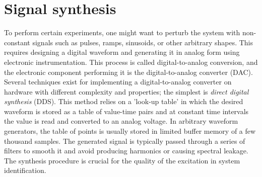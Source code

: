 

\section{Signal synthesis}

To perform certain experiments, one might want to perturb the system with non-constant signals such as pulses, ramps, sinusoids, or other arbitrary shapes.
This requires designing a digital waveform and generating it in analog form using electronic instrumentation.
This process is called digital-to-analog conversion, and the electronic component performing it is the digital-to-analog converter (DAC).
Several techniques exist for implementing a digital-to-analog converter on hardware with different complexity and properties; the simplest is \emph{direct digital synthesis} (DDS).
This method relies on a 'look-up table' in which the desired waveform is stored as a table of value-time pairs and at constant time intervals the value is read and converted to an analog voltage.
In arbitrary waveform generators, the table of points is usually stored in limited buffer memory of a few thousand samples.
The generated signal is typically passed through a series of filters to smooth it and avoid producing harmonics or causing spectral leakage.
The synthesis procedure is crucial for the quality of the excitation in system identification.

